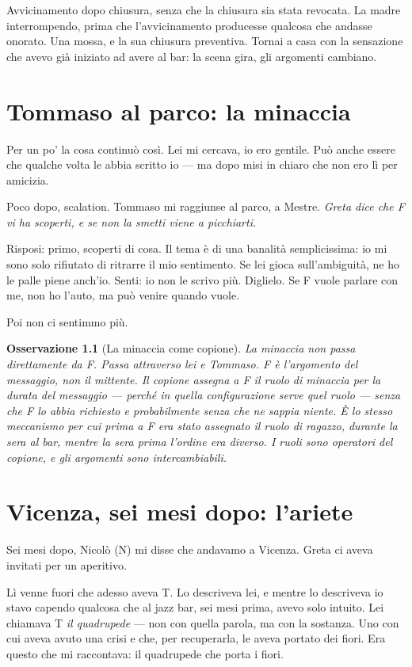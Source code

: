 \documentclass[
    oneside,                 %
    openany,                 %
    titlepage,
    11pt,
    a4paper,
    italian,
    DIV=14,                  %
    headinclude,
    footinclude=true,
    cleardoublepage=empty
]{scrbook}
\theoremstyle{ctplain}
\theoremstyle{ctdef}
\theoremstyle{ctrem}
\newtheorem*{oss}{Osservazione}
\begin{document}
Avvicinamento dopo chiusura, senza che la chiusura sia stata revocata. La madre interrompendo, prima che l'avvicinamento producesse qualcosa che andasse onorato. Una mossa, e la sua chiusura preventiva. Tornai a casa con la sensazione che avevo già iniziato ad avere al bar: la scena gira, gli argomenti cambiano.

\chapter{Tommaso al parco: la minaccia}

Per un po' la cosa continuò così. Lei mi cercava, io ero gentile. Può anche essere che qualche volta le abbia scritto io --- ma dopo misi in chiaro che non ero lì per amicizia.

Poco dopo, scalation. Tommaso mi raggiunse al parco, a Mestre. \emph{Greta dice che F vi ha scoperti, e se non la smetti viene a picchiarti.}

Risposi: primo, scoperti di cosa. Il tema è di una banalità semplicissima: io mi sono solo rifiutato di ritrarre il mio sentimento. Se lei gioca sull'ambiguità, ne ho le palle piene anch'io. Senti: io non le scrivo più. Diglielo. Se F vuole parlare con me, non ho l'auto, ma può venire quando vuole.

Poi non ci sentimmo più.

\begin{oss}[La minaccia come copione]
La minaccia non passa direttamente da F. Passa attraverso lei e Tommaso. F è l'\emph{argomento} del messaggio, non il mittente. Il copione assegna a F il ruolo di minaccia per la durata del messaggio --- perché in quella configurazione serve quel ruolo --- senza che F lo abbia richiesto e probabilmente senza che ne sappia niente. È lo stesso meccanismo per cui prima a F era stato assegnato il ruolo di ragazzo, durante la sera al bar, mentre la sera prima l'ordine era diverso. I ruoli sono operatori del copione, e gli argomenti sono intercambiabili.
\end{oss}

\chapter{Vicenza, sei mesi dopo: l'ariete}

Sei mesi dopo, Nicolò (N) mi disse che andavamo a Vicenza. Greta ci aveva invitati per un aperitivo.

Lì venne fuori che adesso aveva T. Lo descriveva lei, e mentre lo descriveva io stavo capendo qualcosa che al jazz bar, sei mesi prima, avevo solo intuito. Lei chiamava T \emph{il quadrupede} --- non con quella parola, ma con la sostanza. Uno con cui aveva avuto una crisi e che, per recuperarla, le aveva portato dei fiori. Era questo che mi raccontava: il quadrupede che porta i fiori.
\end{document}
